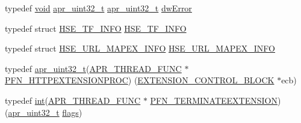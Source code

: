 \begin{DoxyCompactItemize}
\item 
typedef \hyperlink{group__MOD__ISAPI_gacd6cdbf73df3d9eed42fa493d9b621a6}{void} \hyperlink{group__apr__platform_ga558548a135d8a816c4787250744ea147}{apr\+\_\+uint32\+\_\+t} \hyperlink{group__apr__platform_ga558548a135d8a816c4787250744ea147}{apr\+\_\+uint32\+\_\+t} \hyperlink{group__MOD__ISAPI_gaf9e0aad3965e7e5ebdcc8b4535ce45cf}{dw\+Error}
\item 
typedef struct \hyperlink{structHSE__TF__INFO}{H\+S\+E\+\_\+\+T\+F\+\_\+\+I\+N\+FO} \hyperlink{group__MOD__ISAPI_gabfc12cedc2231d060172b0c6881cb54c}{H\+S\+E\+\_\+\+T\+F\+\_\+\+I\+N\+FO}
\item 
typedef struct \hyperlink{structHSE__URL__MAPEX__INFO}{H\+S\+E\+\_\+\+U\+R\+L\+\_\+\+M\+A\+P\+E\+X\+\_\+\+I\+N\+FO} \hyperlink{group__MOD__ISAPI_ga59caa7446d41fe8097c25ada1823a936}{H\+S\+E\+\_\+\+U\+R\+L\+\_\+\+M\+A\+P\+E\+X\+\_\+\+I\+N\+FO}
\item 
typedef \hyperlink{group__apr__platform_ga558548a135d8a816c4787250744ea147}{apr\+\_\+uint32\+\_\+t}(\hyperlink{group__apr__platform_gade8f829f9bd98fd4386894acf72edd7c}{A\+P\+R\+\_\+\+T\+H\+R\+E\+A\+D\+\_\+\+F\+U\+NC} $\ast$ \hyperlink{group__MOD__ISAPI_gae198ae4c18c63385512ff7e8492524f6}{P\+F\+N\+\_\+\+H\+T\+T\+P\+E\+X\+T\+E\+N\+S\+I\+O\+N\+P\+R\+OC}) (\hyperlink{structEXTENSION__CONTROL__BLOCK}{E\+X\+T\+E\+N\+S\+I\+O\+N\+\_\+\+C\+O\+N\+T\+R\+O\+L\+\_\+\+B\+L\+O\+CK} $\ast$ecb)
\item 
typedef \hyperlink{pcre_8txt_a42dfa4ff673c82d8efe7144098fbc198}{int}(\hyperlink{group__apr__platform_gade8f829f9bd98fd4386894acf72edd7c}{A\+P\+R\+\_\+\+T\+H\+R\+E\+A\+D\+\_\+\+F\+U\+NC} $\ast$ \hyperlink{group__MOD__ISAPI_ga952f8bc8dd87aa9ea5457c7f21536e95}{P\+F\+N\+\_\+\+T\+E\+R\+M\+I\+N\+A\+T\+E\+E\+X\+T\+E\+N\+S\+I\+ON}) (\hyperlink{group__apr__platform_ga558548a135d8a816c4787250744ea147}{apr\+\_\+uint32\+\_\+t} \hyperlink{pcre_8txt_ad7a10cd81a384ff727296d05bb827806}{flags})
\end{DoxyCompactItemize}
